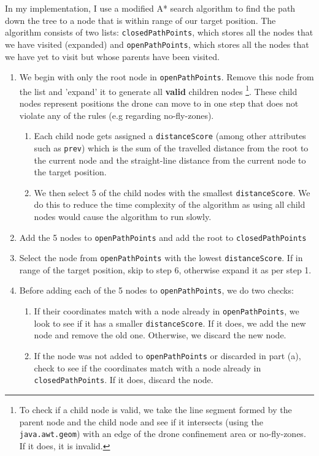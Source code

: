 \documentclass[11pt]{article}
\begin{document}
In my implementation, I use a modified A* search algorithm to find the path down the tree to a node that is within range of our target position. The algorithm consists of two lists: \texttt{closedPathPoints}, which stores all the nodes that we have visited (expanded) and \texttt{openPathPoints}, which stores all the nodes that we have yet to visit but whose parents have been visited.
\begin{enumerate}[topsep=0pt, itemsep=0pt]
  \item We begin with only the root node in \texttt{openPathPoints}. Remove this node from the list and 'expand' it to generate all \textbf{valid} children nodes \footnote{To check if a child node is valid, we take the line segment formed by the parent node and the child node and see if it intersects (using the \texttt{java.awt.geom}) with an edge of the drone confinement area or no-fly-zones. If it does, it is invalid.}. These child nodes represent positions the drone can move to in one step that does not violate any of the rules (e.g regarding no-fly-zones).
  \begin{enumerate}[topsep=0pt, itemsep=0pt]
      \item Each child node gets assigned a \texttt{distanceScore} (among other attributes such as \texttt{prev}) which is the sum of the travelled distance from the root to the current node and the straight-line distance from the current node to the target position.
      \item We then select 5 of the child nodes with the smallest \texttt{distanceScore}. We do this to reduce the time complexity of the algorithm as using all child nodes would cause the algorithm to run slowly.
  \end{enumerate}
  
  \item Add the 5 nodes to \texttt{openPathPoints} and add the root to \texttt{closedPathPoints}
  
  \item Select the node from \texttt{openPathPoints} with the lowest \texttt{distanceScore}. If in range of the target position, skip to step 6, otherwise expand it as per step 1.
  
  \item Before adding each of the 5 nodes to \texttt{openPathPoints}, we do two checks:
  \begin{enumerate}[topsep=0pt, itemsep=0pt]
      \item If their coordinates match with a node already in \texttt{openPathPoints}, we look to see if it has a smaller \texttt{distanceScore}. If it does, we add the new node and remove the old one. Otherwise, we discard the new node.
      \item If the node was not added to \texttt{openPathPoints} or discarded in part (a), check to see if the coordinates match with a node already in \texttt{closedPathPoints}. If it does, discard the node.      
    \end{enumerate}   
    

\end{enumerate}
\end{document}
